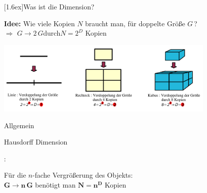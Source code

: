 \documentclass[final]{beamer}
\newlength{\columnheight}
\newlength{\marginw}
\newlength{\tw}
\newlength{\colsep}
\newlength{\colw}
\newenvironment{myTwoColPoster}{%
  \begin{minipage}[t]{\textwidth}%
    \hspace*{\marginw}%
    \hspace*{9.5bp}%
    \begin{minipage}[t]{\tw}}%
  {\end{minipage}%
   \hspace*{\marginw}%
   \end{minipage}}
\newenvironment{myCol}%
    {\begin{minipage}[t][\columnheight][t]{\colw}}%
    {\end{minipage}}
\newenvironment{textblock}[1]%
    {\begin{block}{\rule[-0.6ex]{0pt}{2.4ex}\raisebox{-0.25ex}[1.6ex]{#1}}%
     \vspace*{5mm}}%
    {\vspace*{5mm}\end{block}}
\begin{document}
\begin{frame}[t]{}
\begin{myTwoColPoster}
\begin{myCol}
\begin{textblock}{Was ist die Dimension?}
\begin{center}
      \textbf{  \textcolor{IPFred}{Idee:} }Wie viele Kopien $N$ braucht man, f\"ur doppelte Gr\"o\ss e $G\,$?\\
      $\Rightarrow$ $G\to2\,G$\hspace*{1.5cm}durch\hspace*{1.5cm}$N=2^D$ Kopien
    \end{center}
    \vspace*{-1.0cm}
    \begin{center}
    \includegraphics[width=0.8\textwidth]{fig/natD}\\
    \begin{minipage}[c]{0.2\textwidth}
      \centerline{  \textcolor{IPFred}{Allgemein} }
      \centerline{  \textcolor{IPFred}{Hausdorff Dimension} }
    \end{minipage}
    \hspace*{1cm}
    \begin{minipage}[c]{0.01\textwidth}\vspace*{-0.5cm}
      {\LARGE :}
    \end{minipage}
    \begin{minipage}[c]{0.5\textwidth}
      \begin{center}
        F\"ur die $n$-fache Vergr\"o\ss erung des Objekts:\\
        $\boldsymbol{G\to n\,G}$ ben\"otigt man $\boldsymbol{N=n^D}$ Kopien
      \end{center}
    \end{minipage}
  \end{center}

  \end{textblock}

  

\end{myCol}
\hfill
\begin{myCol}
  

\end{myCol}
\end{myTwoColPoster}
\end{frame}
\end{document}
